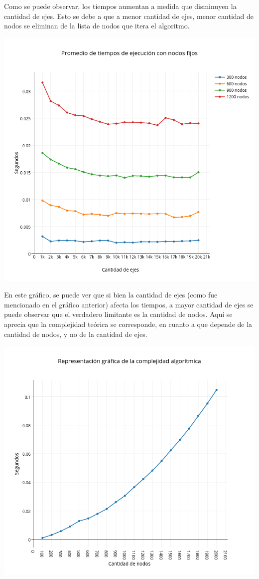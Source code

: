 Como se puede observar, los tiempos aumentan a medida que disminuyen la cantidad de ejes. Esto se debe a que a menor cantidad de ejes, menor cantidad de nodos se eliminan de la lista de nodos que itera el algoritmo.

\includegraphics[width=15cm,keepaspectratio=yes]{imagenes/greedy/fixnode.png}

En este gráfico, se puede ver que si bien la cantidad de ejes (como fue mencionado en el gráfico anterior) afecta los tiempos, a mayor cantidad de ejes se puede observar que el verdadero limitante es la cantidad de nodos. Aquí se aprecia que la complejidad teórica se corresponde, en cuanto a que depende de la cantidad de nodos, y no de la cantidad de ejes.

\includegraphics[width=15cm,keepaspectratio=yes]{imagenes/greedy/worst1.png}

